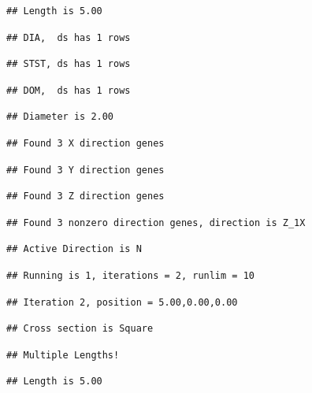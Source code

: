 \documentclass[]{article}
\begin{document}
\begin{verbatim}
## Length is 5.00
\end{verbatim}

\begin{verbatim}
## DIA,  ds has 1 rows
\end{verbatim}

\begin{verbatim}
## STST, ds has 1 rows
\end{verbatim}

\begin{verbatim}
## DOM,  ds has 1 rows
\end{verbatim}

\begin{verbatim}
## Diameter is 2.00
\end{verbatim}

\begin{verbatim}
## Found 3 X direction genes
\end{verbatim}

\begin{verbatim}
## Found 3 Y direction genes
\end{verbatim}

\begin{verbatim}
## Found 3 Z direction genes
\end{verbatim}

\begin{verbatim}
## Found 3 nonzero direction genes, direction is Z_1X
\end{verbatim}

\begin{verbatim}
## Active Direction is N
\end{verbatim}

\begin{verbatim}
## Running is 1, iterations = 2, runlim = 10
\end{verbatim}

\begin{verbatim}
## Iteration 2, position = 5.00,0.00,0.00
\end{verbatim}

\begin{verbatim}
## Cross section is Square
\end{verbatim}

\begin{verbatim}
## Multiple Lengths!
\end{verbatim}

\begin{verbatim}
## Length is 5.00
\end{verbatim}
\end{document}
